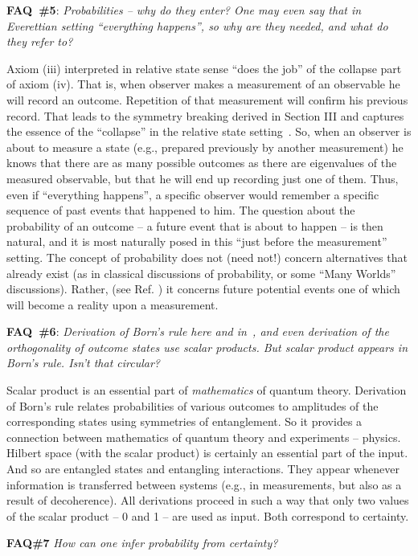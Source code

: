 \documentclass[aps,amsmath,amssymb,amsfonts,floatfix]{revtex4-1}
\newcommand{\+}         {\dagger}
\begin{document}
{{{{\bf FAQ~\#5}: {\it Probabilities -- why do they enter? One may even say that in Everettian setting ``everything happens'', so why are they needed, and what do they refer to?}

Axiom (iii) interpreted in relative state sense ``does the job'' of the collapse part of axiom (iv). That is, when observer makes a measurement of an observable he will record an outcome. Repetition of that measurement will confirm his previous record. That leads to the symmetry breaking derived in Section III and captures the essence of the ``collapse'' in the relative state setting~\cite{75,79}. So, when an observer is about to measure a state (e.g., prepared previously by another measurement) he knows that there are as many possible outcomes as there are eigenvalues of the measured observable, but that he will end up recording just one of them. Thus, even if ``everything happens'', a specific observer would remember a specific sequence of past events that happened to him. The question about the probability of an outcome -- a future event that is about to happen -- is then natural, and it is most naturally posed in this ``just before the measurement'' setting. The concept of probability does not (need not!) concern alternatives that already exist (as in classical discussions of probability, or some ``Many Worlds'' discussions). Rather, (see Ref. \cite{78,Sebens}) it concerns future potential events one of which will become a reality upon a measurement.

{\bf FAQ~\#6}: {\it Derivation of Born's rule here and in~\cite{75,76,78,Z07a}, and even derivation of the orthogonality of outcome states use scalar products. But scalar product appears in Born's rule. Isn't that circular?}

Scalar product is an essential part of {\it mathematics} of quantum theory. Derivation of Born's rule relates probabilities of various outcomes to amplitudes of the corresponding states using symmetries of entanglement. So it provides a connection between mathematics of quantum theory and experiments -- physics. Hilbert space (with the scalar product) is certainly an essential part of the input. And so are entangled states and entangling interactions. They appear whenever information is transferred between systems (e.g., in measurements, but also as a result of decoherence). All derivations proceed in such a way that only two values of the scalar product -- 0 and 1 -- are used as input. Both correspond to certainty. 

{\bf FAQ\#7} {\it How can one infer probability from certainty?}

}}}
\end{document}

